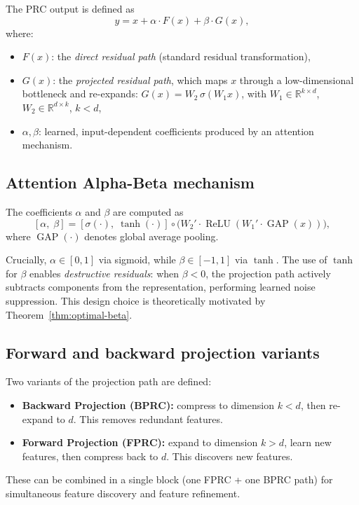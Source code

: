 \documentclass[11pt,a4paper]{article}
\theoremstyle{definition}
\DeclareMathOperator{\GAP}{GAP}
\DeclareMathOperator{\ReLU}{ReLU}
\begin{document}
The PRC output is defined as
\begin{equation}
  \label{eq:prc}
  y = x + \alpha \cdot F(x) + \beta \cdot G(x),
\end{equation}
where:
\begin{itemize}[nosep]
  \item $F(x)$: the \emph{direct residual path} (standard residual transformation),
  \item $G(x)$: the \emph{projected residual path}, which maps $x$ through a
        low-dimensional bottleneck and re-expands:
        $G(x) = W_2 \,\sigma(W_1 x)$, with $W_1 \in \mathbb{R}^{k \times d}$,
        $W_2 \in \mathbb{R}^{d \times k}$, $k < d$,
  \item $\alpha, \beta$: learned, input-dependent coefficients produced by an
        attention mechanism.
\end{itemize}

\subsection{Attention Alpha-Beta mechanism}

The coefficients $\alpha$ and $\beta$ are computed as
\begin{equation}
  \label{eq:alpha-beta}
  [\alpha,\; \beta] = [\sigma(\cdot),\; \tanh(\cdot)] \circ
  \bigl(W_2' \cdot \ReLU(W_1' \cdot \GAP(x))\bigr),
\end{equation}
where $\GAP(\cdot)$ denotes global average pooling.

Crucially, $\alpha \in [0, 1]$ via sigmoid, while $\beta \in [-1, 1]$ via $\tanh$.
The use of $\tanh$ for $\beta$ enables \emph{destructive residuals}: when $\beta < 0$,
the projection path actively subtracts components from the representation,
performing learned noise suppression. This design choice is theoretically
motivated by Theorem~\ref{thm:optimal-beta}.

\subsection{Forward and backward projection variants}

Two variants of the projection path are defined:
\begin{itemize}[nosep]
  \item \textbf{Backward Projection (BPRC):} compress to dimension $k < d$,
        then re-expand to $d$. This removes redundant features.
  \item \textbf{Forward Projection (FPRC):} expand to dimension $k > d$,
        learn new features, then compress back to $d$. This discovers new features.
\end{itemize}
These can be combined in a single block (one FPRC + one BPRC path) for
simultaneous feature discovery and feature refinement.
\end{document}
